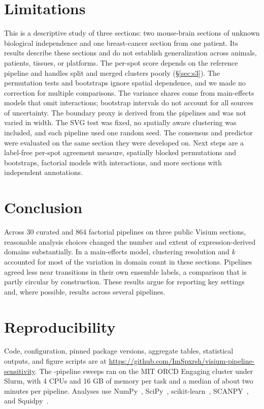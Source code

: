 \documentclass[conference]{IEEEtran}
\begin{document}
\section{Limitations}
This is a descriptive study of three sections: two mouse-brain sections of
unknown biological independence and one breast-cancer section from one
patient. Its results describe these sections and do not establish
generalization across animals, patients, tissues, or platforms. The
per-spot score depends on the reference pipeline and handles split and
merged clusters poorly (\S\ref{sec:s3}). The permutation tests and
bootstraps ignore spatial dependence, and we made no correction for
multiple comparisons. The variance shares come from main-effects models that omit interactions; bootstrap intervals do not account for all sources
of uncertainty. The boundary proxy is derived from the pipelines and
was not varied in width. The SVG test was fixed, no spatially aware
clustering was included, and each pipeline used one random seed. The consensus and
predictor were evaluated on the same section they were developed on. Next
steps are a label-free per-spot agreement measure, spatially blocked
permutations and bootstraps, factorial models with interactions, and more
sections with independent annotations.

\section{Conclusion}
Across 30 curated and 864 factorial pipelines on three public Visium
sections, reasonable analysis choices changed the number and extent of
expression-derived domains substantially. In a main-effects model,
clustering resolution and $k$ accounted for most of the variation in
domain count in these sections. Pipelines agreed less near transitions in
their own ensemble labels, a comparison that is partly circular by
construction. These results argue for reporting key settings and, where
possible, results across several pipelines.

\section*{Reproducibility}
Code, configuration, pinned package versions, aggregate tables, statistical
outputs, and figure scripts are at
\url{https://github.com/ImSpxrsh/visium-pipeline-sensitivity}. The \FullNspecs{}-pipeline
sweeps ran on the MIT ORCD Engaging cluster under Slurm, with 4 CPUs and
16 GB of memory per task and a median of about two minutes per pipeline.
Analyses use NumPy~\cite{harris2020array}, SciPy~\cite{virtanen2020scipy},
scikit-learn~\cite{pedregosa2011scikit}, SCANPY~\cite{wolf2018scanpy}, and
Squidpy~\cite{palla2022squidpy}.
\end{document}

